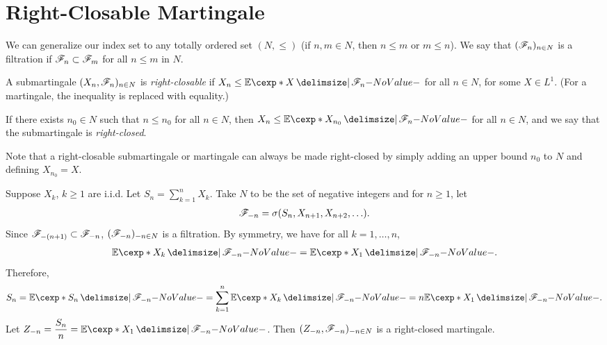 \documentclass[12pt]{article}
\begin{document}


\section{Right-Closable Martingale}

We can generalize our index set to any totally ordered set $(N, \leq)$ (if $n,m\in N$, then $n \leq m$ or $m \leq n$). We say that $(\mathscr{F}_n)_{n\in N}$ is a filtration if $\mathscr{F}_n \subset \mathscr{F}_m$ for all $n \leq m$ in $N$. 

\begin{Definition}
A submartingale $(X_n,\mathscr{F}_n)_{n\in N}$ is \emph{right-closable} if $X_n \leq \E[X \given \scF_n]$ for all $n\in N$, for some $X \in L^1$. (For a martingale, the inequality is replaced with equality.)

If there exists $n_0\in N$ such that $n\leq n_0$ for all $n\in N$, then $X_n \leq \E[X_{n_0} \given \scF_n]$ for all $n\in N$, and we say that the submartingale is \emph{right-closed}.
\end{Definition}
Note that a right-closable submartingale or martingale can always be made right-closed by simply adding an upper bound $n_0$ to $N$ and defining $X_{n_0} = X$.

\begin{Example}\label{wk15:reverse_martingale}
Suppose $X_k$, $k\geq1$ are i.i.d. Let $S_n = \sum_{k=1}^n X_k$. Take $N$ to be the set of negative integers and for $n\geq1$, let
\begin{align*}
\mathscr{F}_{-n} = \sigma(S_n, X_{n+1}, X_{n+2}, \ldots).
\end{align*}
Since $\mathscr{F}_{-(n+1)} \subset \mathscr{F}_{-n}$, $(\mathscr{F}_{-n})_{-n\in N}$ is a filtration. By symmetry, we have for all $k=1,\ldots,n$,
\begin{align*}
\E[X_k \given \scF_{-n}] = \E[X_1 \given \scF_{-n}].
\end{align*}
Therefore,
\begin{align*}
S_n = \E[S_n \given \scF_{-n}] = \sum_{k=1}^n \E[X_k \given \scF_{-n}] = n \E[X_1 \given \scF_{-n}].
\end{align*}
Let $Z_{-n}= \dfrac{S_n}{n} = \E[X_1 \given \scF_{-n}]$. Then $(Z_{-n}, \mathscr{F}_{-n})_{-n\in N}$ is a right-closed martingale.
\end{Example}
\end{document}
